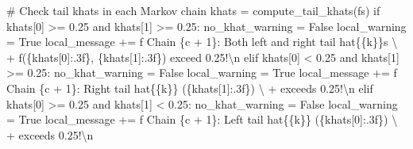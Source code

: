\documentclass[
  letterpaper,
  DIV=11,
  numbers=noendperiod]{scrartcl}
\newenvironment{Shaded}{\begin{snugshade}}{\end{snugshade}}
\newcommand{\CharTok}[1]{\textcolor[rgb]{0.13,0.47,0.30}{#1}}
\newcommand{\CommentTok}[1]{\textcolor[rgb]{0.37,0.37,0.37}{#1}}
\newcommand{\ControlFlowTok}[1]{\textcolor[rgb]{0.00,0.23,0.31}{#1}}
\newcommand{\DecValTok}[1]{\textcolor[rgb]{0.68,0.00,0.00}{#1}}
\newcommand{\FloatTok}[1]{\textcolor[rgb]{0.68,0.00,0.00}{#1}}
\newcommand{\KeywordTok}[1]{\textcolor[rgb]{0.00,0.23,0.31}{#1}}
\newcommand{\NormalTok}[1]{\textcolor[rgb]{0.00,0.23,0.31}{#1}}
\newcommand{\OperatorTok}[1]{\textcolor[rgb]{0.37,0.37,0.37}{#1}}
\newcommand{\SpecialCharTok}[1]{\textcolor[rgb]{0.37,0.37,0.37}{#1}}
\newcommand{\SpecialStringTok}[1]{\textcolor[rgb]{0.13,0.47,0.30}{#1}}
\newcommand{\StringTok}[1]{\textcolor[rgb]{0.13,0.47,0.30}{#1}}
\newcommand{\VariableTok}[1]{\textcolor[rgb]{0.07,0.07,0.07}{#1}}
\begin{document}
\begin{Shaded}
\begin{Highlighting}[]
      \CommentTok{\# Check tail khats in each Markov chain}
\NormalTok{      khats }\OperatorTok{=}\NormalTok{ compute\_tail\_khats(fs)}
      \ControlFlowTok{if}\NormalTok{ khats[}\DecValTok{0}\NormalTok{] }\OperatorTok{\textgreater{}=} \FloatTok{0.25} \KeywordTok{and}\NormalTok{ khats[}\DecValTok{1}\NormalTok{] }\OperatorTok{\textgreater{}=} \FloatTok{0.25}\NormalTok{:}
\NormalTok{        no\_khat\_warning }\OperatorTok{=} \VariableTok{False}
\NormalTok{        local\_warning }\OperatorTok{=} \VariableTok{True}
\NormalTok{        local\_message }\OperatorTok{+=}  \SpecialStringTok{f\textquotesingle{}  Chain }\SpecialCharTok{\{}\NormalTok{c }\OperatorTok{+} \DecValTok{1}\SpecialCharTok{\}}\SpecialStringTok{: Both left and right tail hat}\CharTok{\{\{}\SpecialStringTok{k}\CharTok{\}\}}\SpecialStringTok{s\textquotesingle{}}\NormalTok{ \textbackslash{}}
                        \OperatorTok{+} \SpecialStringTok{f\textquotesingle{}(}\SpecialCharTok{\{}\NormalTok{khats[}\DecValTok{0}\NormalTok{]}\SpecialCharTok{:.3f\}}\SpecialStringTok{, }\SpecialCharTok{\{}\NormalTok{khats[}\DecValTok{1}\NormalTok{]}\SpecialCharTok{:.3f\}}\SpecialStringTok{) exceed 0.25!}\CharTok{\textbackslash{}n}\SpecialStringTok{\textquotesingle{}}
      \ControlFlowTok{elif}\NormalTok{ khats[}\DecValTok{0}\NormalTok{] }\OperatorTok{\textless{}} \FloatTok{0.25} \KeywordTok{and}\NormalTok{ khats[}\DecValTok{1}\NormalTok{] }\OperatorTok{\textgreater{}=} \FloatTok{0.25}\NormalTok{:}
\NormalTok{        no\_khat\_warning }\OperatorTok{=} \VariableTok{False}
\NormalTok{        local\_warning }\OperatorTok{=} \VariableTok{True}
\NormalTok{        local\_message }\OperatorTok{+=}  \SpecialStringTok{f\textquotesingle{}  Chain }\SpecialCharTok{\{}\NormalTok{c }\OperatorTok{+} \DecValTok{1}\SpecialCharTok{\}}\SpecialStringTok{: Right tail hat}\CharTok{\{\{}\SpecialStringTok{k}\CharTok{\}\}}\SpecialStringTok{ (}\SpecialCharTok{\{}\NormalTok{khats[}\DecValTok{1}\NormalTok{]}\SpecialCharTok{:.3f\}}\SpecialStringTok{)\textquotesingle{}}\NormalTok{ \textbackslash{}}
                        \OperatorTok{+} \StringTok{\textquotesingle{} exceeds 0.25!}\CharTok{\textbackslash{}n}\StringTok{\textquotesingle{}}
      \ControlFlowTok{elif}\NormalTok{ khats[}\DecValTok{0}\NormalTok{] }\OperatorTok{\textgreater{}=} \FloatTok{0.25} \KeywordTok{and}\NormalTok{ khats[}\DecValTok{1}\NormalTok{] }\OperatorTok{\textless{}} \FloatTok{0.25}\NormalTok{:}
\NormalTok{        no\_khat\_warning }\OperatorTok{=} \VariableTok{False}
\NormalTok{        local\_warning }\OperatorTok{=} \VariableTok{True}
\NormalTok{        local\_message }\OperatorTok{+=}  \SpecialStringTok{f\textquotesingle{}  Chain }\SpecialCharTok{\{}\NormalTok{c }\OperatorTok{+} \DecValTok{1}\SpecialCharTok{\}}\SpecialStringTok{: Left tail hat}\CharTok{\{\{}\SpecialStringTok{k}\CharTok{\}\}}\SpecialStringTok{ (}\SpecialCharTok{\{}\NormalTok{khats[}\DecValTok{0}\NormalTok{]}\SpecialCharTok{:.3f\}}\SpecialStringTok{)\textquotesingle{}}\NormalTok{ \textbackslash{}}
                        \OperatorTok{+} \StringTok{\textquotesingle{} exceeds 0.25!}\CharTok{\textbackslash{}n}\StringTok{\textquotesingle{}}
      

\end{Highlighting}
\end{Shaded}
\end{document}
